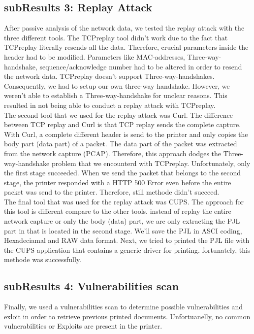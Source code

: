 \documentclass[a4paper]{article}
\begin{document}
\subsection{subResults 3: Replay Attack }
After passive analysis of the network data, we tested the replay attack with the three different tools. The TCPreplay tool didn't work due to the fact that TCPreplay literally
resends all the data. Therefore, crucial parameters inside the header had
to be modified. Parameters like MAC-addresses, Three-way-handshake,
sequence/acknowledge number had to be altered in order to resend the
network data. TCPreplay doesn't support Three-way-handshakes.
Consequently, we had to setup our own three-way handshake. However, we
weren't able to establish a Three-way-handshake for unclear reasons. This
resulted in not being able to conduct a  replay attack with TCPreplay.\\

The second tool that we used for the replay attack was Curl. The
difference between TCP replay and Curl is that TCP replay sends the
complete capture. With Curl, a complete different header is send to the
printer and only copies the body part (data part) of a packet. The data
part of the packet was extracted from the network capture (PCAP).
Therefore, this approach  dodges the  Three-way-handshake problem that we
encounterd with TCPreplay. Unfortunately, only the first stage succeeded.
When we send the packet that belongs to the second stage, the printer
responded with a HTTP 500 Error even before the entire packet was send to
the printer. Therefore, still methode didn't succeed.\\

The final tool that was used for the replay attack was CUPS. The approach
for this tool is different compare to the other tools. instead of replay
the entire network capture or only the body (data) part, we are only
extracting the PJL part in that is located in the second stage. We'll save
the PJL in ASCI coding, Hexadeciamal and RAW data format. Next, we tried
to printed the PJL file with the CUPS application that contains a generic
driver for printing. fortunately, this methode was successfully.

\subsection{subResults 4: Vulnerabilities scan }
Finally, we used a vulnerabilities scan to determine  possible vulnerabilities and exloit in order to retrieve previous printed documents. Unfortuanelly, no common vulnerabilities or Exploits are present in the printer.
\end{document}
